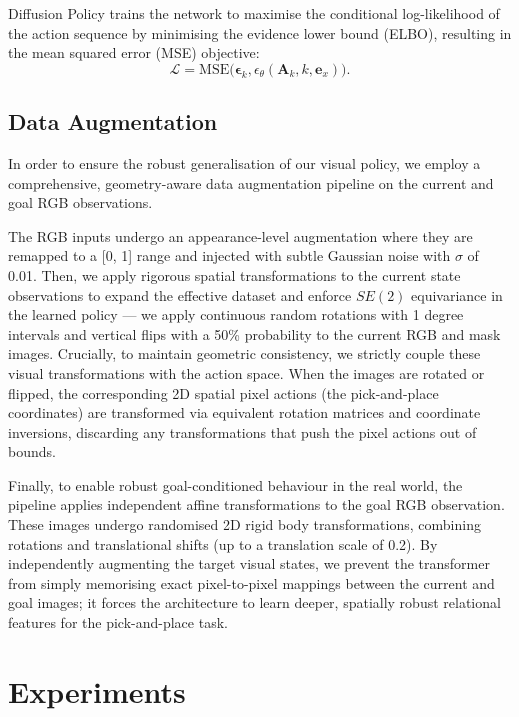 \documentclass[journal]{IEEEtran}
\begin{document}
Diffusion Policy trains the network to maximise the conditional log-likelihood of the action sequence by minimising the evidence lower bound (ELBO), resulting in the mean squared error (MSE) objective:
\begin{equation}
\mathcal{L} = \mathrm{MSE}\Big(\boldsymbol{\epsilon}_k, \epsilon_\theta(\bm{A}_k, k, \bm{e}_x)\Big).
\label{eqn:diffusion-policy-loss}
\end{equation}
\subsection{Data Augmentation} \label{sec:data-aug}

In order to ensure the robust generalisation of our visual policy, we employ a comprehensive, geometry-aware data augmentation pipeline on the current and goal RGB observations.

The RGB inputs undergo an appearance-level augmentation where they are remapped to a [0, 1] range and injected with subtle Gaussian noise with $\sigma$ of 0.01. Then, we apply rigorous spatial transformations to the current state observations to expand the effective dataset and enforce $SE(2)$ equivariance in the learned policy --- we apply continuous random rotations with 1 degree intervals and vertical flips with a 50\% probability to the current RGB and mask images. Crucially, to maintain geometric consistency, we strictly couple these visual transformations with the action space. When the images are rotated or flipped, the corresponding 2D spatial pixel actions (the pick-and-place coordinates) are transformed via equivalent rotation matrices and coordinate inversions,  discarding any transformations that push the pixel actions out of bounds.

Finally, to enable robust goal-conditioned behaviour in the real world, the pipeline applies independent affine transformations to the goal RGB observation. These images undergo randomised 2D rigid body transformations, combining rotations and translational shifts (up to a translation scale of 0.2). By independently augmenting the target visual states, we prevent the transformer from simply memorising exact pixel-to-pixel mappings between the current and goal images; it forces the architecture to learn deeper, spatially robust relational features for the pick-and-place task.

\section{Experiments} \label{sec:experiments}
\end{document}
